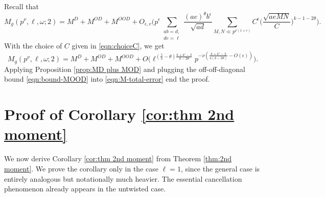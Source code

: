 \documentclass[12pt]{amsart}
\theoremstyle{plain}
\theoremstyle{definition}
\begin{document}
Recall that 
\[
M_g(p^\nu, \ell, \omega;2)
= M^D+M^{OD}+M^{OOD}
+O_{\epsilon, v}\bigg( p^{\epsilon}{ \sum_{\substack{ab=d,  \\ de=\ell}} \frac{(ae)^{\theta}b^{\epsilon}}{\sqrt{ad}}} 
\sum_{M, N \ll p^{\nu(1+\epsilon)}}C^{\epsilon}\Big(\frac{\sqrt{aeMN}}{C}\Big)^{k-1-2\theta} \bigg).
\]
With the choice of $C$ given in \eqref{eqn:choiceC}, we get
\begin{equation}\label{eqn:M-total-error}
M_g(p^\nu, \ell, \omega;2)
= M^D+M^{OD}+M^{OOD}
+O\Big(\ell^{\left(\frac54-\theta\right)\frac{k+k'-2}{k-2\theta}}
p^{-\nu\left(\frac{k+k'-2}{4(k-2\theta)}-O(\epsilon)\right)}\Big).
\end{equation}
Applying Proposition \ref{prop:MD plus MOD} and plugging the off-off-diagonal bound \eqref{eqn:bound-MOOD} into  \eqref{eqn:M-total-error} end the proof.



\section{Proof of Corollary \ref{cor:thm 2nd moment}}\label{sec:cor}

We now derive Corollary \ref{cor:thm 2nd moment} from Theorem \ref{thm:2nd moment}.  We prove the corollary only in the case $\ell=1$, since the general case is entirely analogous but notationally much heavier. The essential cancellation phenomenon already appears in the untwisted case.
\end{document}
